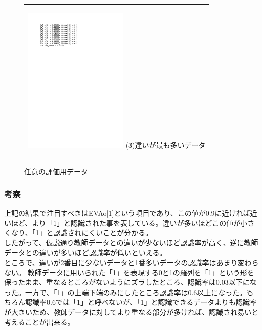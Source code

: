\begin{figure}[htbp]
\begin{center}
\begin{tabular}{c}
      \begin{minipage}{0.33\hsize}
        \begin{center}
          \includegraphics[clip, width=5.0cm]{./lebel3-3figs/e3.pdf}
          \hspace{2.3cm} (3)違いが最も多いデータ
        \end{center}
      \end{minipage}

    \end{tabular}
    \caption{任意の評価用データ}
  \end{center}
\end{figure}
\subsubsection{考察}
上記の結果で注目すべきはEVAo[1]という項目であり、この値が0.9に近ければ近いほど、より「1」と認識された事を表している。違いが多いほどこの値が小さくなり、「1」と認識されにくいことが分かる。\\
したがって、仮説通り教師データとの違いが少ないほど認識率が高く、逆に教師データとの違いが多いほど認識率が低いといえる。\\ところで、違いが2番目に少ないデータと1番多いデータの認識率はあまり変わらない。
教師データに用いられた「1」を表現する0と1の羅列を「1」という形を保ったまま、重なるところがないようにズラしたところ、認識率は0.03以下になった。一方で、「1」の上端下端のみにしたところ認識率は0.6以上になった。もちろん認識率0.6では「1」と呼べないが、「1」と認識できるデータよりも認識率が大きいため、教師データに対してより重なる部分が多ければ、認識され易いと考えることが出来る。

